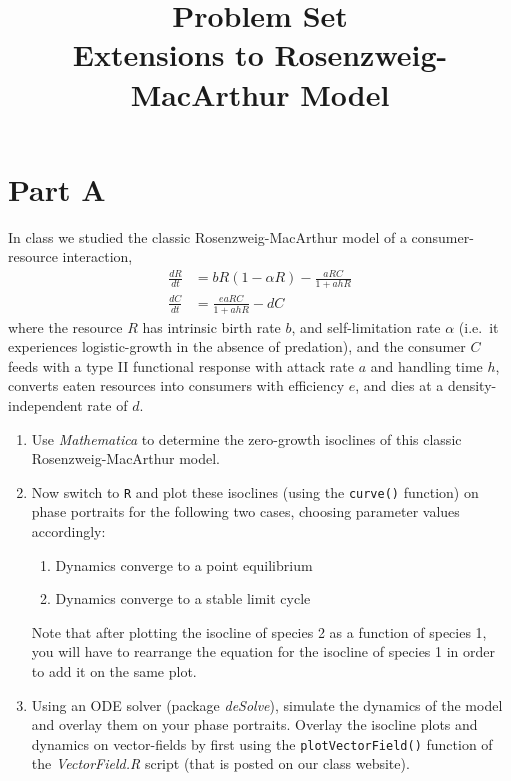 \documentclass[11pt,letterpaper]{article}
\title{\textbf{Problem Set}\\Extensions to Rosenzweig-MacArthur Model\vspace{-3em}}
\date{}
\author{}
\begin{document}
	\maketitle
	
	\section{Part A}
	
	In class we studied the classic Rosenzweig-MacArthur model of a consumer-resource interaction,
	\begin{align}
		\frac{dR}{dt} & = b R (1- \alpha R) - \frac{ a R C}{1 + a h R} \\
		\frac{dC}{dt} & = \frac{e a R C}{1 + a h R} - d C
	\end{align}
	where the resource $R$ has intrinsic birth rate $b$, and self-limitation rate $\alpha$ (i.e.~it experiences logistic-growth in the absence of predation), and the consumer $C$ feeds with a type II functional response with attack rate $a$ and handling time $h$, converts eaten resources into consumers with efficiency $e$, and dies at a density-independent rate of $d$.
	
	\begin{enumerate}
	\item Use \textit{Mathematica} to determine the zero-growth isoclines of this classic Rosenzweig-MacArthur model.
	
	\item Now switch to \texttt{R} and plot these isoclines (using the \texttt{curve()} function) on phase portraits for the following two cases, choosing parameter values accordingly:
		\begin{enumerate}
		\item Dynamics converge to a point equilibrium
		\item Dynamics converge to a stable limit cycle
		\end{enumerate}
	Note that after plotting the isocline of species 2 as a function of species 1, you will have to rearrange the equation for the isocline of species 1 in order to add it on the same plot.
	
	\item Using an ODE solver (package \textit{deSolve}), simulate the dynamics of the model and overlay them on your phase portraits.  
	Overlay the isocline plots and dynamics on vector-fields by first using the \texttt{plotVectorField()} function of the \textit{VectorField.R} script (that is posted on our class website).
	
	\end{enumerate}
	
\end{document}
